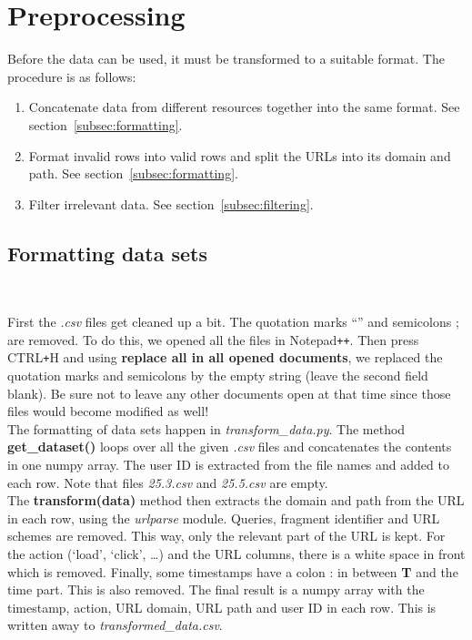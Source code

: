 
\section{Preprocessing}\label{sec:preprocessing}

Before the data can be used, it must be transformed to a suitable format. The procedure is as follows:

\begin{enumerate}
	\item Concatenate data from different resources together into the same format. See section~\ref{subsec:formatting}.
	\item Format invalid rows into valid rows and split the URLs into its domain and path. See section~\ref{subsec:formatting}.
	\item Filter irrelevant data. See section~\ref{subsec:filtering}.
\end{enumerate}

\subsection{Formatting data sets}~\label{subsec:formatting}

First the \textit{.csv} files get cleaned up a bit. The quotation marks ``'' and semicolons ; are removed. To do this, we opened all the files in Notepad\verb!++!. Then press CTRL\verb!+!H and using \textbf{replace all in all opened documents}, we replaced the quotation marks and semicolons by the empty string (leave the second field blank). Be sure not to leave any other documents open at that time since those files would become modified as well!
\\[2ex]
The formatting of data sets happen in \textit{transform\_data.py}. The method \textbf{get\_dataset()} loops over all the given \textit{.csv} files and concatenates the contents in one numpy array. The user ID is extracted from the file names and added to each row. Note that files \textit{25.3.csv} and \textit{25.5.csv} are empty.
\\[2ex]
The \textbf{transform(data)} method then extracts the domain and path from the URL in each row, using the \textit{urlparse} module. Queries, fragment identifier and URL schemes are removed. This way, only the relevant part of the URL is kept. For the action (`load', `click', \ldots) and the URL columns, there is a white space in front which is removed. Finally, some timestamps have a colon : in between \textbf{T} and the time part. This is also removed. The final result is a numpy array with the timestamp, action, URL domain, URL path and user ID in each row. This is written away to \textit{transformed\_data.csv}.


